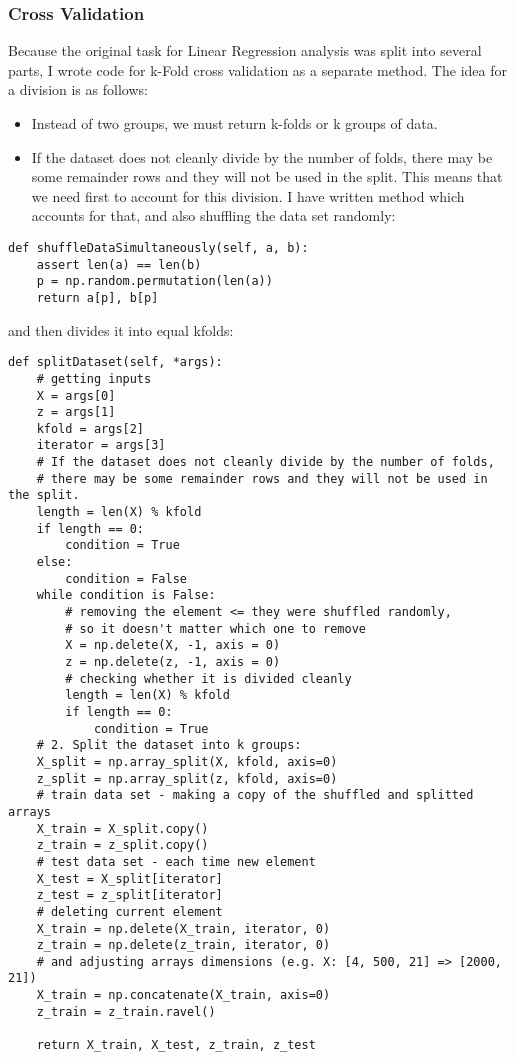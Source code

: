 \subsubsection{Cross Validation}
Because the original task for Linear Regression analysis was split into several parts, I wrote code for k-Fold cross validation as a separate method. The idea for a division is as follows:
\begin{itemize}
    \item Instead of two groups, we must return k-folds or k groups of data.
    \item If the dataset does not cleanly divide by the number of folds, there may be some remainder rows and they will not be used in the split. This means that we need first to account for this division. I have written method which accounts for that, and also shuffling the data set randomly:
\end{itemize}
\begin{lstlisting}
def shuffleDataSimultaneously(self, a, b):
    assert len(a) == len(b)
    p = np.random.permutation(len(a))
    return a[p], b[p]
\end{lstlisting}
and then divides it into equal kfolds:
\begin{lstlisting}
def splitDataset(self, *args):
    # getting inputs
    X = args[0]
    z = args[1]
    kfold = args[2]
    iterator = args[3]
    # If the dataset does not cleanly divide by the number of folds,
    # there may be some remainder rows and they will not be used in the split.
    length = len(X) % kfold
    if length == 0:
        condition = True
    else:
        condition = False
    while condition is False:
        # removing the element <= they were shuffled randomly,
        # so it doesn't matter which one to remove
        X = np.delete(X, -1, axis = 0)
        z = np.delete(z, -1, axis = 0)
        # checking whether it is divided cleanly
        length = len(X) % kfold
        if length == 0:
            condition = True
    # 2. Split the dataset into k groups:
    X_split = np.array_split(X, kfold, axis=0)
    z_split = np.array_split(z, kfold, axis=0)
    # train data set - making a copy of the shuffled and splitted arrays
    X_train = X_split.copy()
    z_train = z_split.copy()
    # test data set - each time new element
    X_test = X_split[iterator]
    z_test = z_split[iterator]
    # deleting current element
    X_train = np.delete(X_train, iterator, 0)
    z_train = np.delete(z_train, iterator, 0)
    # and adjusting arrays dimensions (e.g. X: [4, 500, 21] => [2000, 21])
    X_train = np.concatenate(X_train, axis=0)
    z_train = z_train.ravel()

    return X_train, X_test, z_train, z_test
\end{lstlisting}
